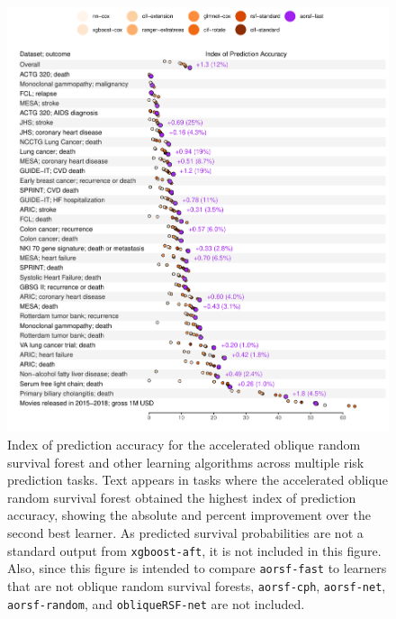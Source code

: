 \documentclass[12pt]{article}\usepackage[]{graphicx}\usepackage[]{xcolor}
\makeatletter
\def\maxwidth{ %
  \ifdim\Gin@nat@width>\linewidth
    \linewidth
  \else
    \Gin@nat@width
  \fi
}
\newenvironment{knitrout}{}{} %
\makeatother
\begin{document}
\begin{knitrout}
\color{fgcolor}\begin{figure}
\includegraphics[width=\maxwidth]{figure/bm_pred_viz_ibs-1} \caption{Index of prediction accuracy for the accelerated oblique random survival forest and other learning algorithms across multiple risk prediction tasks. Text appears in tasks where the accelerated oblique random survival forest obtained the highest index of prediction accuracy, showing the absolute and percent improvement over the second best learner. As predicted survival probabilities are not a standard output from \texttt{xgboost-aft}, it is not included in this figure. Also, since this figure is intended to compare \texttt{aorsf-fast} to learners that are not oblique random survival forests, \texttt{aorsf-cph}, \texttt{aorsf-net}, \texttt{aorsf-random}, and \texttt{obliqueRSF-net} are not included.}\label{fig:bm_pred_viz_ibs}
\end{figure}

\end{knitrout}
\end{document}
